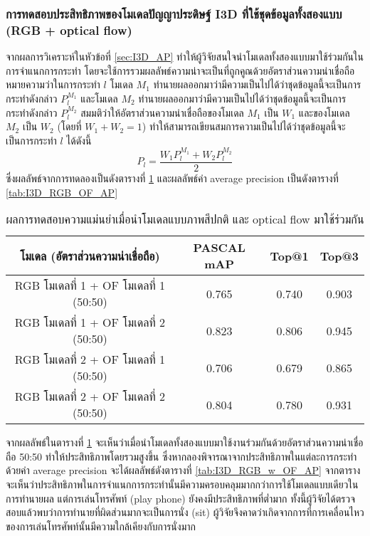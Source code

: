 \subsubsection{การทดสอบประสิทธิภาพของโมเดลปัญญาประดิษฐ์ I3D ที่ใช้ชุดข้อมูลทั้งสองแบบ (RGB + optical flow)}
จากผลการวิเคราะห์ในหัวข้อที่ \ref{sec:I3D_AP} ทำให้ผู้วิจัยสนใจนำโมเดลทั้งสองแบบมาใช้ร่วมกันในการจำแนกการกระทำ โดยจะใช้การรวมผลลัพธ์ความน่าจะเป็นที่ถูกคูณด้วยอัตราส่วนความน่าเชื่อถือ
หมายความว่าในการกระทำ $l$ โมเดล $M_1$ ทำนายผลออกมาว่ามีความเป็นไปได้ว่าชุดข้อมูลนี้จะเป็นการกระทำดังกล่าว $P_l^{M_1}$ 
และโมเดล $M_2$ ทำนายผลออกมาว่ามีความเป็นไปได้ว่าชุดข้อมูลนี้จะเป็นการกระทำดังกล่าว $P_l^{M_2}$ สมมติว่าให้อัตราส่วนความน่าเชื่อถือของโมเดล $M_1$ เป็น $W_1$
และของโมเดล $M_2$ เป็น $W_2$ (โดยที่ $W_1 + W_2 = 1$) ทำให้สามารถเขียนสมการความเป็นไปได้ว่าชุดข้อมูลนี้จะเป็นการกระทำ $l$ ได้ดังนี้
\begin{equation}
	P_l = \frac{W_1 P_l^{M_1} + W_2 P_l^{M_2}}{2}
\end{equation}
ซึ่งผลลัพธ์จากการทดลองเป็นดังตารางที่ \ref{tab:I3D_RGB_OF_performance} และผลลัพธ์ค่า average precision เป็นดังตารางที่ \ref{tab:I3D_RGB_OF_AP}
\begin{table}[!ht]
	\centering
	\begin{tabular}{|c|c|c|c|}
			\hline
			{โมเดล (อัตราส่วนความน่าเชื่อถือ)}	&	{PASCAL mAP}	&	{Top@1}	&	{Top@3}\\
			\hline
			RGB โมเดลที่ 1 + OF โมเดลที่ 1 (50:50)	& 0.765	& 0.740	& 0.903	\\
			RGB โมเดลที่ 1 + OF โมเดลที่ 2 (50:50)	& 0.823	& 0.806	& 0.945	\\
			RGB โมเดลที่ 2 + OF โมเดลที่ 1 (50:50)	& 0.706	& 0.679	& 0.865	\\
			RGB โมเดลที่ 2 + OF โมเดลที่ 2 (50:50)	& 0.804	& 0.780	& 0.931	\\
			\hline
	\end{tabular}
\caption{ผลการทดสอบความแม่นยำเมื่อนำโมเดลแบบภาพสีปกติ และ optical flow มาใช้ร่วมกัน}
\label{tab:I3D_RGB_OF_performance}
\end{table}
จากผลลัพธ์ในตารางที่ \ref{tab:I3D_RGB_OF_performance} จะเห็นว่าเมื่อนำโมเดลทั้งสองแบบมาใช้งานร่วมกันด้วยอัตราส่วนความน่าเชื่อถือ 50:50 ทำให้ประสิทธิภาพโดยรวมสูงขึ้น
ซึ่งหากลองพิจารณาจากประสิทธิภาพในแต่ละการกระทำ ด้วยค่า average precision จะได้ผลลัพธ์ดังตารางที่ \ref{tab:I3D_RGB_w_OF_AP} 
จากตารางจะเห็นว่าประสิทธิภาพในการจำแนกการกระทำนั้นมีความครอบคลุมมากกว่าการใช้โมเดลแบบเดียวในการทำนายผล แต่การเล่นโทรศัพท์ (play phone) ยังคงมีประสิทธิภาพที่ต่ำมาก
ทั้งนี้ผู้วิจัยได้ตรวจสอบแล้วพบว่าการทำนายที่ผิดส่วนมากจะเป็นการนั่ง (sit) ผู้วิจัยจึงคาดว่าเกิดจากการที่การเคลื่อนไหวของการเล่นโทรศัพท์นั้นมีความใกล้เคียงกับการนั่งมาก
